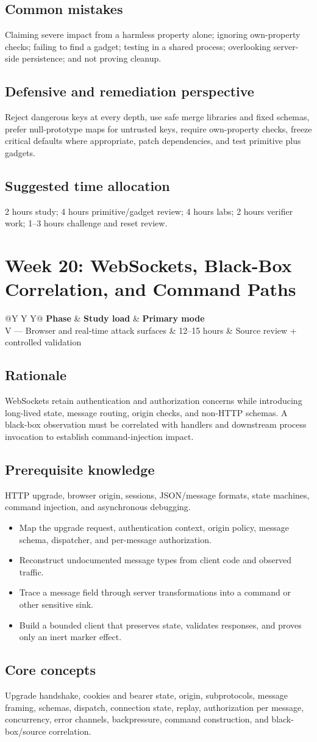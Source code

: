 \documentclass[11pt]{article}
\makeatletter
\newcommand{\weekheader}[4]{%
  \clearpage
  \section{Week #1: #2}
  \begin{tcolorbox}[colback=Navy,colframe=Navy,coltext=white]
    \begin{tabularx}{\linewidth}{@{}Y Y Y@{}}
      \textbf{Phase} & \textbf{Study load} & \textbf{Primary mode}\\
      #3 & #4 hours & Source review + controlled validation
    \end{tabularx}
  \end{tcolorbox}
}
\newcommand{\weekfield}[2]{%
  \Needspace{5\baselineskip}
  \subsection*{#1}
  #2
}
\makeatother
\begin{document}
\weekfield{Common mistakes}{Claiming severe impact from a harmless property alone;
ignoring own-property checks; failing to find a gadget; testing in a shared
process; overlooking server-side persistence; and not proving cleanup.}

\weekfield{Defensive and remediation perspective}{Reject dangerous keys at every
depth, use safe merge libraries and fixed schemas, prefer null-prototype maps for
untrusted keys, require own-property checks, freeze critical defaults where
appropriate, patch dependencies, and test primitive plus gadgets.}

\weekfield{Suggested time allocation}{2 hours study; 4 hours primitive/gadget
review; 4 hours labs; 2 hours verifier work; 1--3 hours challenge and reset review.}

\weekheader{20}{WebSockets, Black-Box Correlation, and Command Paths}{V --- Browser and real-time attack surfaces}{12--15}

\weekfield{Rationale}{WebSockets retain authentication and authorization concerns
while introducing long-lived state, message routing, origin checks, and non-HTTP
schemas. A black-box observation must be correlated with handlers and downstream
process invocation to establish command-injection impact.}

\weekfield{Prerequisite knowledge}{HTTP upgrade, browser origin, sessions,
JSON/message formats, state machines, command injection, and asynchronous debugging.}

\begin{objectivebox}
\begin{itemize}
  \item Map the upgrade request, authentication context, origin policy, message schema, dispatcher, and per-message authorization.
  \item Reconstruct undocumented message types from client code and observed traffic.
  \item Trace a message field through server transformations into a command or other sensitive sink.
  \item Build a bounded client that preserves state, validates responses, and proves only an inert marker effect.
\end{itemize}
\end{objectivebox}

\weekfield{Core concepts}{Upgrade handshake, cookies and bearer state, origin,
subprotocols, message framing, schemas, dispatch, connection state, replay,
authorization per message, concurrency, error channels, backpressure, command
construction, and black-box/source correlation.}
\end{document}
